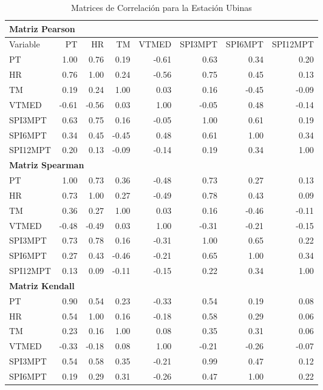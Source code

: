 \begin{table}[ht]
\centering
\caption{Matrices de Correlación para la Estación Ubinas}
\begin{tabular}{lrrrrrrr}
\toprule
\multicolumn{8}{l}{\textbf{Matriz Pearson}} \\
\midrule
Variable & PT & HR & TM & VTMED & SPI3MPT & SPI6MPT & SPI12MPT \\
\midrule
PT       & 1.00 & 0.76 & 0.19 & -0.61 & 0.63 & 0.34 & 0.20 \\
HR       & 0.76 & 1.00 & 0.24 & -0.56 & 0.75 & 0.45 & 0.13 \\
TM       & 0.19 & 0.24 & 1.00 & 0.03 & 0.16 & -0.45 & -0.09 \\
VTMED    & -0.61 & -0.56 & 0.03 & 1.00 & -0.05 & 0.48 & -0.14 \\
SPI3MPT  & 0.63 & 0.75 & 0.16 & -0.05 & 1.00 & 0.61 & 0.19 \\
SPI6MPT  & 0.34 & 0.45 & -0.45 & 0.48 & 0.61 & 1.00 & 0.34 \\
SPI12MPT & 0.20 & 0.13 & -0.09 & -0.14 & 0.19 & 0.34 & 1.00 \\
\midrule
\multicolumn{8}{l}{\textbf{Matriz Spearman}} \\
\midrule
PT       & 1.00 & 0.73 & 0.36 & -0.48 & 0.73 & 0.27 & 0.13 \\
HR       & 0.73 & 1.00 & 0.27 & -0.49 & 0.78 & 0.43 & 0.09 \\
TM       & 0.36 & 0.27 & 1.00 & 0.03 & 0.16 & -0.46 & -0.11 \\
VTMED    & -0.48 & -0.49 & 0.03 & 1.00 & -0.31 & -0.21 & -0.15 \\
SPI3MPT  & 0.73 & 0.78 & 0.16 & -0.31 & 1.00 & 0.65 & 0.22 \\
SPI6MPT  & 0.27 & 0.43 & -0.46 & -0.21 & 0.65 & 1.00 & 0.34 \\
SPI12MPT & 0.13 & 0.09 & -0.11 & -0.15 & 0.22 & 0.34 & 1.00 \\
\midrule
\multicolumn{8}{l}{\textbf{Matriz Kendall}} \\
\midrule
PT       & 0.90 & 0.54 & 0.23 & -0.33 & 0.54 & 0.19 & 0.08 \\
HR       & 0.54 & 1.00 & 0.16 & -0.18 & 0.58 & 0.29 & 0.06 \\
TM       & 0.23 & 0.16 & 1.00 & 0.08 & 0.35 & 0.31 & 0.06 \\
VTMED    & -0.33 & -0.18 & 0.08 & 1.00 & -0.21 & -0.26 & -0.07 \\
SPI3MPT  & 0.54 & 0.58 & 0.35 & -0.21 & 0.99 & 0.47 & 0.12 \\
SPI6MPT  & 0.19 & 0.29 & 0.31 & -0.26 & 0.47 & 1.00 & 0.22 \\

\end{tabular}
\end{table}
